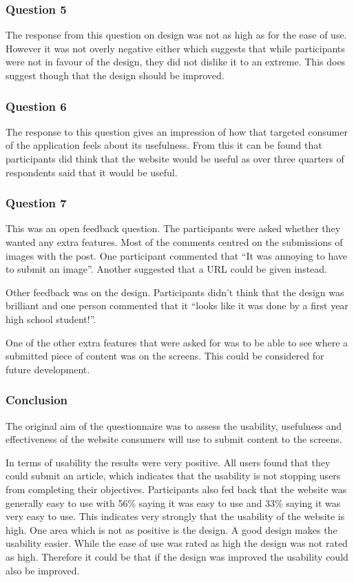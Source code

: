 \subsubsection*{Question 5}
The response from this question on design was not as high as for the ease of use. However it was not overly negative either which suggests that while participants were not in favour of the design, they did not dislike it to an extreme. This does suggest though that the design should be improved.

\subsubsection*{Question 6}
The response to this question gives an impression of how that targeted consumer of the application feels about its usefulness. From this it can be found that participants did think that the website would be useful as over three quarters of respondents said that it would be useful.

\subsubsection*{Question 7}
This was an open feedback question. The participants were asked whether they wanted any extra features. Most of the comments centred on the submissions of images with the post. One participant commented that ``It was annoying to have to submit an image''. Another suggested that a URL could be given instead. 

Other feedback was on the design. Participants didn't think that the design was brilliant and one person commented that it ``looks like it was done by a first year high school student!''.

One of the other extra features that were asked for was to be able to see where a submitted piece of content was on the screens. This could be considered for future development.

\clearpage{}
\subsubsection{Conclusion}

The original aim of the questionnaire was to assess the usability, usefulness and effectiveness of the website consumers will use to submit content to the screens. 

In terms of usability the results were very positive. All users found that they could submit an article, which indicates that the usability is not stopping users from completing their objectives. Participants also fed back that the website was generally easy to use with 56\% saying it was easy to use and 33\% saying it was very easy to use. This indicates very strongly that the usability of the website is high. One area which is not as positive is the design. A good design makes the usability easier. While the ease of use was rated as high the design was not rated as high. Therefore it could be that if the design was improved the usability could also be improved.

